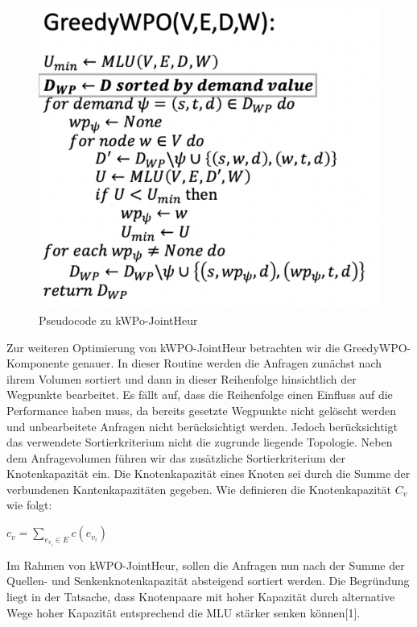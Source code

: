 \documentclass[sigconf,noacm,review]{acmart}
\begin{document}
\begin{figure}[h]
  \centering
  \includegraphics[width=\linewidth]{abbildungen/pseudo1}
  \caption{Pseudocode zu kWPo-JointHeur}
\end{figure}
Zur weiteren Optimierung von kWPO-JointHeur betrachten wir die GreedyWPO-Komponente genauer. In dieser Routine werden die Anfragen zunächst nach ihrem Volumen sortiert und dann in dieser Reihenfolge hinsichtlich der Wegpunkte bearbeitet. Es fällt auf, dass die Reihenfolge einen Einfluss auf die Performance haben muss, da bereits gesetzte Wegpunkte nicht gelöscht werden und unbearbeitete Anfragen nicht berücksichtigt werden. Jedoch berücksichtigt das verwendete Sortierkriterium nicht die zugrunde liegende Topologie.
Neben dem Anfragevolumen führen wir das zusätzliche Sortierkriterium der Knotenkapazität ein. Die Knotenkapazität eines Knoten sei durch die Summe der verbundenen Kantenkapazitäten gegeben.
Wie definieren die Knotenkapazität $C_v$ wie folgt: \begin{center} $c_v = \sum_{e_{v_{i}} \in E} c(e_{v_i})$\end{center}
Im Rahmen von kWPO-JointHeur, sollen die Anfragen nun nach der Summe der Quellen- und Senkenknotenkapazität absteigend sortiert werden. Die Begründung liegt in der Tatsache, dass Knotenpaare mit hoher Kapazität durch alternative Wege hoher Kapazität entsprechend die MLU stärker senken können[1].
\end{document}
